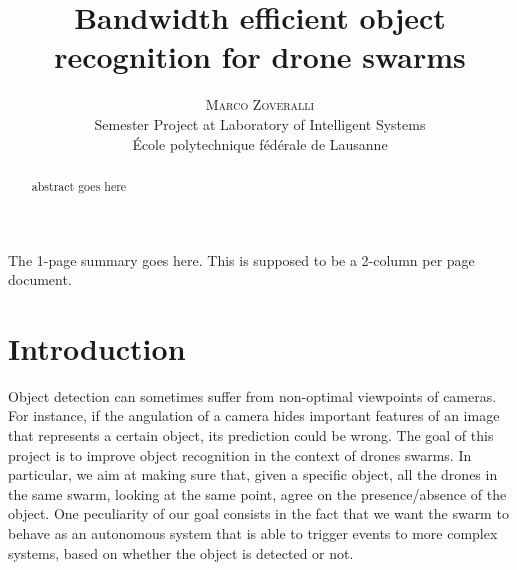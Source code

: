 \documentclass[10pt,conference,compsocconf]{IEEEtran}
\begin{document}
	
\pretitle{\begin{center}\Huge\bfseries} %
\posttitle{\end{center}} %
\title{Bandwidth efficient object recognition for drone swarms}

\author{
	\textsc{Marco Zoveralli} \\
	\normalsize{Semester Project at Laboratory of Intelligent Systems} \\
	\normalsize \'{E}cole polytechnique f\'{e}d\'{e}rale de Lausanne
}

\maketitle
The 1-page summary goes here. This is supposed to be a 2-column per page document.
\clearpage{}

\begin{abstract}
abstract goes here
\end{abstract}

\section{Introduction}
Object detection can sometimes suffer from non-optimal viewpoints of cameras. For instance, if the angulation of a camera hides important features of an image that represents a certain object, its prediction could be wrong. The goal of this project is to improve object recognition in the context of drones swarms. In particular, we aim at making sure that, given a specific object, all the drones in the same swarm, looking at the same point, agree on the presence/absence of the object. One peculiarity of our goal consists in the fact that we want the swarm to behave as an autonomous system that is able to trigger events to more complex systems, based on whether the object is detected or not.
\end{document}

